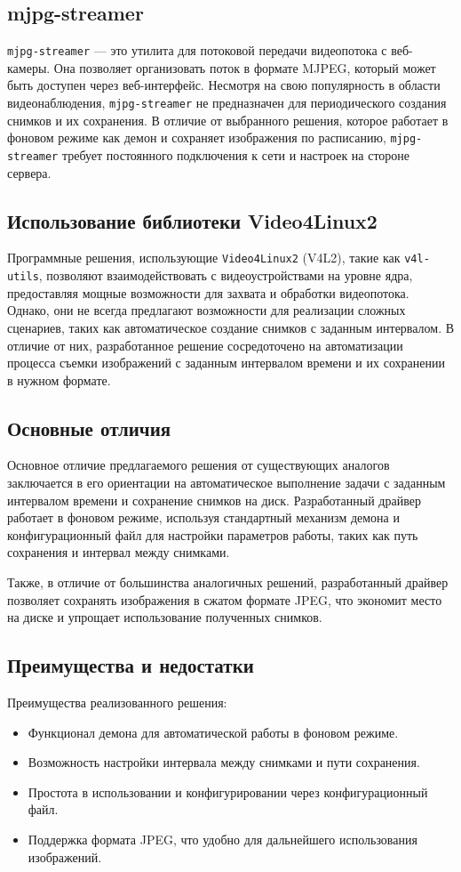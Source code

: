 \documentclass[12pt]{article}
\begin{document}
\subsection*{mjpg-streamer}
\texttt{mjpg-streamer} — это утилита для потоковой передачи видеопотока с веб-камеры. Она позволяет организовать поток в формате MJPEG, который может быть доступен через веб-интерфейс. Несмотря на свою популярность в области видеонаблюдения, \texttt{mjpg-streamer} не предназначен для периодического создания снимков и их сохранения. В отличие от выбранного решения, которое работает в фоновом режиме как демон и сохраняет изображения по расписанию, \texttt{mjpg-streamer} требует постоянного подключения к сети и настроек на стороне сервера.

\subsection*{Использование библиотеки Video4Linux2}
Программные решения, использующие \texttt{Video4Linux2} (V4L2), такие как \texttt{v4l-utils}, позволяют взаимодействовать с видеоустройствами на уровне ядра, предоставляя мощные возможности для захвата и обработки видеопотока. Однако, они не всегда предлагают возможности для реализации сложных сценариев, таких как автоматическое создание снимков с заданным интервалом. В отличие от них, разработанное решение сосредоточено на автоматизации процесса съемки изображений с заданным интервалом времени и их сохранении в нужном формате.

\subsection*{Основные отличия}
Основное отличие предлагаемого решения от существующих аналогов заключается в его ориентации на автоматическое выполнение задачи с заданным интервалом времени и сохранение снимков на диск. Разработанный драйвер работает в фоновом режиме, используя стандартный механизм демона и конфигурационный файл для настройки параметров работы, таких как путь сохранения и интервал между снимками.

Также, в отличие от большинства аналогичных решений, разработанный драйвер позволяет сохранять изображения в сжатом формате JPEG, что экономит место на диске и упрощает использование полученных снимков.

\subsection*{Преимущества и недостатки}
Преимущества реализованного решения:
\begin{itemize}
    \item Функционал демона для автоматической работы в фоновом режиме.
    \item Возможность настройки интервала между снимками и пути сохранения.
    \item Простота в использовании и конфигурировании через конфигурационный файл.
    \item Поддержка формата JPEG, что удобно для дальнейшего использования изображений.
\end{itemize}
\end{document}

